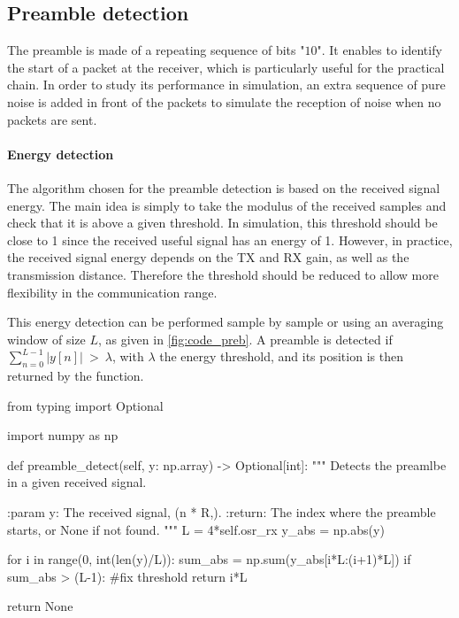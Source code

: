 \subsection{Preamble detection}
The preamble is made of a repeating sequence of bits "$10$". It enables to identify the start of a packet at the receiver, which is particularly useful for the practical chain. In order to study its performance in simulation, an extra sequence of pure noise is added in front of the packets to simulate the reception of noise when no packets are sent.

\paragraph{Energy detection} The algorithm chosen for the preamble detection is based on the received signal energy. The main idea is simply to take the modulus of the received samples and check that it is above a given threshold. In simulation, this threshold should be close to 1 since the received useful signal has an energy of 1. However, in practice, the received signal energy depends on the TX and RX gain, as well as the transmission distance. Therefore the threshold should be reduced to allow more flexibility in the communication range.

This energy detection can be performed sample by sample or using an averaging window of size $L$, as given in \autoref{fig:code_preb}. A preamble is detected if $\sum_{n=0}^{L-1}|y[n]| \: > \: \lambda$,
with $\lambda$ the energy threshold, and its position is then returned by the function.

\begin{listing}[H]
\begin{python}
from typing import Optional

import numpy as np

def preamble_detect(self, y: np.array) -> Optional[int]:
    """
    Detects the preamlbe in a given received signal.

    :param y: The received signal, (n * R,).
    :return: The index where the preamble starts,
        or None if not found.
    """
    L = 4*self.osr_rx
    y_abs = np.abs(y)

    for i in range(0, int(len(y)/L)):
        sum_abs = np.sum(y_abs[i*L:(i+1)*L])
        if sum_abs > (L-1): #fix threshold
            return i*L

    return None

\end{python}
\caption{Python code for preamble detection (from \textbf{chain.py}).}
\label{fig:code_preb}
\end{listing}

